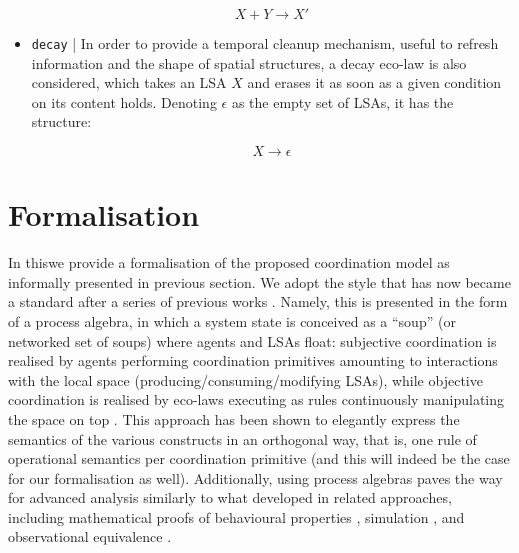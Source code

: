 \documentclass[12pt,a4paper,twoside,openright]{book}
\begin{document}
\begin{itemize}
 \[X + Y \rightarrow X'\]
 
 \item \texttt{decay} | In order to provide a temporal cleanup mechanism, useful to refresh information and the shape of spatial structures, a decay eco-law is also considered, which takes an LSA $X$ and erases it as soon as a given condition on its content holds. Denoting $\epsilon$ as the empty set of LSAs, it has the structure:
 
 \[X \rightarrow \epsilon\]
 
\end{itemize}

\section{Formalisation}

In this\levelText{}we provide a formalisation of the proposed coordination model as informally presented in previous section. We adopt the style that has now became a standard after a series of previous works \cite{zavattaro,VO-FI2006,VPB-COORD2012,TerepetaNN12,BortolussiLM13,MassinkL12,LaneseBF13}.
%
Namely, this is presented in the form of a process algebra, in which a system state is conceived as a ``soup'' (or networked set of soups) where agents and LSAs float: subjective coordination is realised by agents performing coordination primitives amounting to interactions with the local space (producing/consuming/modifying LSAs), while objective coordination is realised by eco-laws executing as rules continuously manipulating the space on top \cite{biochemicalTupleSpaces,tucson-aamas99,RicciOD02}.
%
This approach has been shown to elegantly express the semantics of the various constructs in an orthogonal way, that is, one rule of operational semantics per coordination primitive (and this will indeed be the case for our formalisation as well). 
%
Additionally, using process algebras paves the way for advanced analysis similarly to what developed in related approaches, including mathematical proofs of behavioural properties \cite{V-SCW2013}, simulation \cite{sapereecolaws-sac2012,DeNicolaLM05}, and observational equivalence \cite{LaneseBF13}.
%
\end{document}
